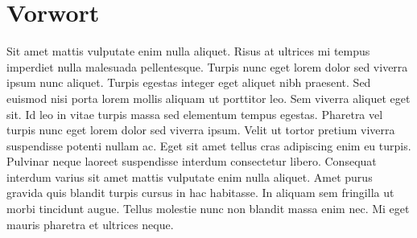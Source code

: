 \chapter{Vorwort}
Sit amet mattis vulputate enim nulla aliquet. Risus at ultrices mi tempus imperdiet nulla malesuada pellentesque. Turpis nunc eget lorem dolor sed viverra ipsum nunc aliquet. Turpis egestas integer eget aliquet nibh praesent. Sed euismod nisi porta lorem mollis aliquam ut porttitor leo. Sem viverra aliquet eget sit. Id leo in vitae turpis massa sed elementum tempus egestas. Pharetra vel turpis nunc eget lorem dolor sed viverra ipsum. Velit ut tortor pretium viverra suspendisse potenti nullam ac. Eget sit amet tellus cras adipiscing enim eu turpis. Pulvinar neque laoreet suspendisse interdum consectetur libero. Consequat interdum varius sit amet mattis vulputate enim nulla aliquet. Amet purus gravida quis blandit turpis cursus in hac habitasse. In aliquam sem fringilla ut morbi tincidunt augue. Tellus molestie nunc non blandit massa enim nec. Mi eget mauris pharetra et ultrices neque.